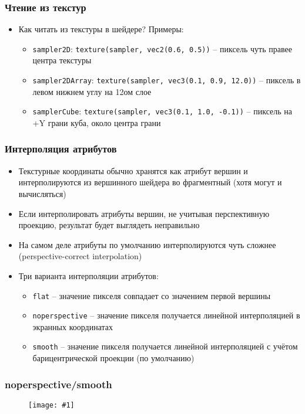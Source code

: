 \documentclass{beamer}
\newcommand{\slideimage}[1]{
  \begin{figure}
    \begin{adjustbox}{width=\textwidth, totalheight=\textheight-2\baselineskip-2\baselineskip,keepaspectratio}
      \texttt{[image: \#1]}
    \end{adjustbox}
  \end{figure}
}
\begin{document}
\begin{frame}[fragile]
\frametitle{Чтение из текстур}
\begin{itemize}
\item Как читать из текстуры в шейдере? Примеры:
\pause
\begin{itemize}
\item \verb|sampler2D|: \verb|texture(sampler, vec2(0.6, 0.5))| -- пиксель чуть правее центра текстуры
\pause
\item \verb|sampler2DArray|: \verb|texture(sampler, vec3(0.1, 0.9, 12.0))| -- пиксель в левом нижнем углу на 12ом слое
\pause
\item \verb|samplerCube|: \verb|texture(sampler, vec3(0.1, 1.0, -0.1))| -- пиксель на +Y грани куба, около центра грани
\end{itemize}
\end{itemize}
\end{frame}

\begin{frame}[fragile]
\frametitle{Интерполяция атрибутов}
\begin{itemize}
\item Текстурные координаты обычно хранятся как атрибут вершин и интерполируются из вершинного шейдера во фрагментный (хотя могут и вычисляться)
\pause
\item Если интерполировать атрибуты вершин, не учитывая перспективную проекцию, результат будет выглядеть неправильно
\pause
\item На самом деле атрибуты по умолчанию интерполируются чуть сложнее (perspective-correct interpolation)
\pause
\item Три варианта интерполяции атрибутов:
\begin{itemize}
\item \verb|flat| -- значение пикселя совпадает со значением первой вершины
\item \verb|noperspective| -- значение пикселя получается линейной интерполяцией в экранных координатах
\item \verb|smooth| -- значение пикселя получается линейной интерполяцией с учётом барицентрической проекции (по умолчанию)
\end{itemize}
\end{itemize}
\end{frame}

\begin{frame}[fragile]
\frametitle{noperspective/smooth}
\slideimage{perspective.png}
\end{frame}
\end{document}
